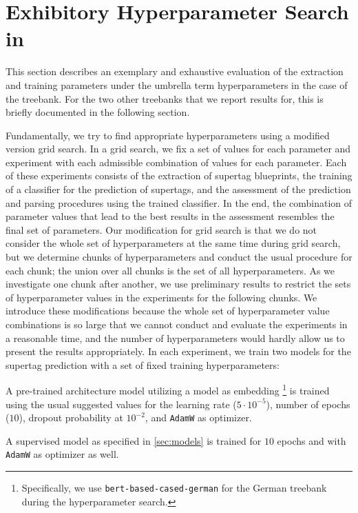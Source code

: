 \documentclass[../../document.tex]{subfiles}
\begin{document}
    \section{Exhibitory Hyperparameter Search in }\label{sec:gridsearch}
    This section describes an exemplary and exhaustive evaluation of the extraction and training parameters under the umbrella term hyperparameters in the case of the \negra{} treebank.
    For the two other treebanks that we report results for, this is briefly documented in the following section.

    Fundamentally, we try to find appropriate hyperparameters using a modified version grid search.
    In a grid search, we fix a set of values for each parameter and experiment with each admissible combination of values for each parameter.
    Each of these experiments consists of the extraction of supertag blueprints, the training of a classifier for the prediction of supertags, and the assessment of the prediction and parsing procedures using the trained classifier.
    In the end, the combination of parameter values that lead to the best results in the assessment resembles the final set of parameters.
    Our modification for grid search is that we do not consider the whole set of hyperparameters at the same time during grid search, but we determine chunks of hyperparameters and conduct the usual procedure for each chunk; the union over all chunks is the set of all hyperparameters.
    As we investigate one chunk after another, we use preliminary results to restrict the sets of hyperparameter values in the experiments for the following chunks.
    We introduce these modifications because the whole set of hyperparameter value combinations is so large that we cannot conduct and evaluate the experiments in a reasonable time, and the number of hyperparameters would hardly allow us to present the results appropriately.
    In each experiment, we train two models for the supertag prediction with a set of fixed training hyperparameters:
    \begin{compactitem}
        \item A pre-trained architecture model utilizing a  model as embedding \footnote{
            Specifically, we use \texttt{bert-based-cased-german} for the German \negra{} treebank during the hyperparameter search.
        } is trained using the usual suggested values for the learning rate ($5\cdot 10^{-5}$), number of epochs ($10$), dropout probability at \(10^{-2}\), and \texttt{AdamW} as optimizer.
        \item A supervised model as specified in \cref{sec:models} is trained for $10$ epochs and with \texttt{AdamW} as optimizer as well.
    \end{compactitem}
\end{document}
